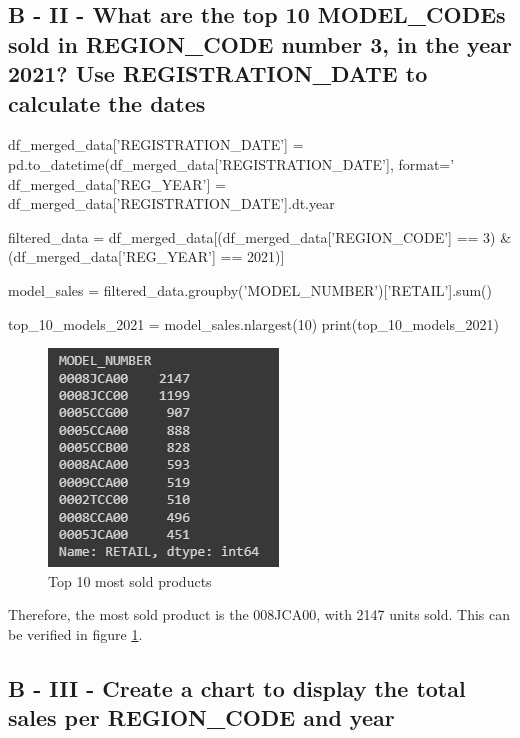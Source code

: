 \documentclass[a4paper, 12pt]{article}
\begin{document}
\subsection{B - II - What are the top 10 MODEL\_CODEs sold in REGION\_CODE number 3, in the year 2021? Use REGISTRATION\_DATE to calculate the dates}

\begin{python}
	df_merged_data['REGISTRATION_DATE'] = pd.to_datetime(df_merged_data['REGISTRATION_DATE'], format='%
	df_merged_data['REG_YEAR'] = df_merged_data['REGISTRATION_DATE'].dt.year
\end{python}

\begin{python}
	filtered_data = df_merged_data[(df_merged_data['REGION_CODE'] == 3) & (df_merged_data['REG_YEAR'] == 2021)]
\end{python}

\begin{python}
	model_sales = filtered_data.groupby('MODEL_NUMBER')['RETAIL'].sum()
\end{python}

\begin{python}
	top_10_models_2021 = model_sales.nlargest(10)
	print(top_10_models_2021)
\end{python}

\begin{figure}[!htb]
	\caption{\label{img_6} Top 10 most sold products}
	\begin{center}
		\includegraphics[scale=1.1]{img_06.PNG}
	\end{center}
\end{figure}

Therefore, the most sold product is the 008JCA00, with 2147 units sold. This can be verified in figure \ref{img_6}.

\newpage

\subsection{B - III - Create a chart to display the total sales per REGION\_CODE and year}
\end{document}
